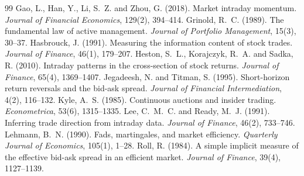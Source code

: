 \documentclass[11pt,a4paper]{article}
\begin{document}
\begin{thebibliography}{99}
 Gao, L., Han, Y., Li, S.~Z. and Zhou, G. (2018). Market intraday momentum. \emph{Journal of Financial Economics}, 129(2), 394--414.
 Grinold, R.~C. (1989). The fundamental law of active management. \emph{Journal of Portfolio Management}, 15(3), 30--37.
 Hasbrouck, J. (1991). Measuring the information content of stock trades. \emph{Journal of Finance}, 46(1), 179--207.
 Heston, S.~L., Korajczyk, R.~A. and Sadka, R. (2010). Intraday patterns in the cross-section of stock returns. \emph{Journal of Finance}, 65(4), 1369--1407.
 Jegadeesh, N. and Titman, S. (1995). Short-horizon return reversals and the bid-ask spread. \emph{Journal of Financial Intermediation}, 4(2), 116--132.
 Kyle, A.~S. (1985). Continuous auctions and insider trading. \emph{Econometrica}, 53(6), 1315--1335.
 Lee, C.~M.~C. and Ready, M.~J. (1991). Inferring trade direction from intraday data. \emph{Journal of Finance}, 46(2), 733--746.
 Lehmann, B.~N. (1990). Fads, martingales, and market efficiency. \emph{Quarterly Journal of Economics}, 105(1), 1--28.
 Roll, R. (1984). A simple implicit measure of the effective bid-ask spread in an efficient market. \emph{Journal of Finance}, 39(4), 1127--1139.
\end{thebibliography}
\end{document}
